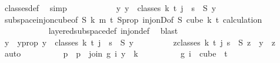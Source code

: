 \begin{isabellebody}
\ classes{\isacharunderscore}{\kern0pt}def\ \isamarkupfalse%
\ simp\isanewline
\ \ \ \ \ \ \ \ \isamarkupfalse%
\ \isamarkupfalse%
\ {\isachardoublequoteopen}{\isasymexists}{\isacharbang}{\kern0pt}y{\isachardot}{\kern0pt}\ y\ {\isasymin}\ classes\ k\ t\ j\ {\isasymand}\ s\ {\isacharequal}{\kern0pt}\ S\ y{\isachardoublequoteclose}\ \isanewline
\ \ \ \ \ \ \ \ \ \ \isamarkupfalse%
\ subspace{\isacharunderscore}{\kern0pt}inj{\isacharunderscore}{\kern0pt}on{\isacharunderscore}{\kern0pt}cube{\isacharbrackleft}{\kern0pt}of\ S\ k\ m\ {\isachardoublequoteopen}t{\isacharplus}{\kern0pt}{}{\isachardoublequoteclose}{\isacharbrackright}{\kern0pt}\ S{\isacharunderscore}{\kern0pt}prop\ inj{\isacharunderscore}{\kern0pt}onD{\isacharbrackleft}{\kern0pt}of\ S\ {\isachardoublequoteopen}cube\ k\ {\isacharparenleft}{\kern0pt}t{\isacharplus}{\kern0pt}{}{\isacharparenright}{\kern0pt}{\isachardoublequoteclose}{\isacharbrackright}{\kern0pt}\ calculation\ \isanewline
\ \ \ \ \ \ \ \ \ \ \isamarkupfalse%
\ layered{\isacharunderscore}{\kern0pt}subspace{\isacharunderscore}{\kern0pt}def\ inj{\isacharunderscore}{\kern0pt}on{\isacharunderscore}{\kern0pt}def\ \isamarkupfalse%
\ blast\isanewline
\ \ \ \ \ \ \ \ \isamarkupfalse%
\ \isamarkupfalse%
\ y\ \ y{\isacharunderscore}{\kern0pt}prop{\isacharcolon}{\kern0pt}\ {\isachardoublequoteopen}y\ {\isasymin}\ classes\ k\ t\ j\ {\isasymand}\ s\ {\isacharequal}{\kern0pt}\ S\ y\ {\isasymand}\isanewline
\ \ \ \ \ \ \ \ {\isacharparenleft}{\kern0pt}{\isasymforall}z{\isasymin}classes\ k\ t\ j{\isachardot}{\kern0pt}\ s\ {\isacharequal}{\kern0pt}\ S\ z\ {\isasymlongrightarrow}\ y\ {\isacharequal}{\kern0pt}\ z{\isacharparenright}{\kern0pt}{\isachardoublequoteclose}\ \isamarkupfalse%
\ auto\isanewline
\isanewline
\ \ \ \ \ \ \ \ \isamarkupfalse%
\ p\ \ {\isachardoublequoteopen}p\ {\isasymequiv}\ join\ {\isacharparenleft}{\kern0pt}{\isasymlambda}g{\isasymin}{\isacharbraceleft}{\kern0pt}{\isachardot}{\kern0pt}{\isachardot}{\kern0pt}{\isacharless}{\kern0pt}{}{\isacharbraceright}{\kern0pt}{\isachardot}{\kern0pt}\ i{\isacharparenright}{\kern0pt}\ y\ {}\ k{\isachardoublequoteclose}\isanewline
\ \ \ \ \ \ \ \ \isamarkupfalse%
\ {\isachardoublequoteopen}{\isacharparenleft}{\kern0pt}{\isasymlambda}g{\isasymin}{\isacharbraceleft}{\kern0pt}{\isachardot}{\kern0pt}{\isachardot}{\kern0pt}{\isacharless}{\kern0pt}{}{\isacharbraceright}{\kern0pt}{\isachardot}{\kern0pt}\ i{\isacharparenright}{\kern0pt}\ {\isasymin}\ cube\ {}\ {\isacharparenleft}{\kern0pt}t{\isacharplus}{\kern0pt}{}{\isacharparenright}{\kern0pt}{\isachardoublequoteclose}\ \isamarkupfalse%

\end{isabellebody}
